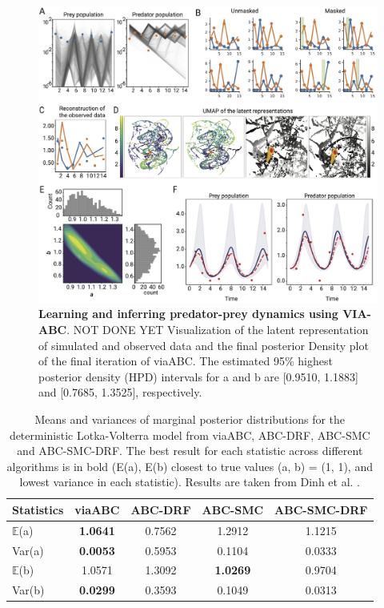 \documentclass[12pt]{article} %
\begin{document}
\begin{figure}[htbp]
    \centering
    \includegraphics[width=1\linewidth]{figures/figure2.jpeg}
\caption{\textbf{Learning and inferring predator-prey dynamics using VIA-ABC}.
NOT DONE YET Visualization of the latent representation of simulated and observed data and the final posterior
Density plot of the final iteration of viaABC. The estimated 95\% highest posterior density (HPD) intervals for a and b are [0.9510, 1.1883] and [0.7685, 1.3525], respectively.}
    \label{fig:lv}
\end{figure}


\begin{table}[htbp]
\centering
\begin{tabular}{l cccc}
\toprule
Statistics & viaABC & ABC-DRF & ABC-SMC & ABC-SMC-DRF \\
\midrule
$\mathbb{E}$(a) &\textbf{1.0641} & 0.7562 & 1.2912 & 1.1215 \\
Var(a) & \textbf{0.0053} & 0.5953 & 0.1104 & 0.0333 \\
$\mathbb{E}$(b) & 1.0571 & 1.3092 & \textbf{1.0269} & 0.9704 \\
Var(b) & \textbf{0.0299} & 0.3593 & 0.1049 & 0.0313 \\
\bottomrule
\end{tabular}
\caption{Means and variances of marginal posterior distributions for the deterministic Lotka-Volterra model from viaABC, ABC-DRF, ABC-SMC and ABC-SMC-DRF. The best result for each statistic across different algorithms is in bold (E(a), E(b) closest to true values (a, b) = (1, 1), and lowest variance in each statistic). Results are taken from Dinh et al. \citep{dinh2024approximate}.}
\label{tab:lotka_volterra_results} %
\end{table}
\end{document}
